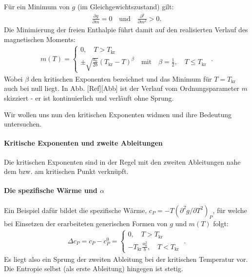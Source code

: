 Für ein Minimum von $g$ (im Gleichgewichtszustand) gilt:
\begin{align*}
    \frac{\partial g}{\partial m}=0 \quad \mathrm{und} \quad \frac{\partial ^g}{\partial m^2}>0.
\end{align*}
Die Minimierung der freien Enthalpie führt damit auf den realisierten Verlauf des magnetischen Moments:
\begin{align*}
    \boxed{m(T)=\left\{
    \begin{aligned}
        0, \quad T>T_\mathrm{kr}\\
        \pm \sqrt{\frac{a_0}{2b}}\left(T_\mathrm{kr}-T\right)^\beta\quad \mathrm{mit} \quad \beta=\frac{1}{2}, \quad T\leq T_\mathrm{kr}
    \end{aligned}
    \right.}\;.
\end{align*}
Wobei $\beta$ den kritischen Exponenten bezeichnet und das Minimum für $T=T_\mathrm{kr}$ auch bei null liegt. In Abb. [Ref][Abb] ist der Verlauf vom Ordnungsparameter $m$ skizziert - er ist kontinuierlich und verläuft ohne Sprung.

Wir wollen uns nun den kritischen Exponenten widmen und ihre Bedeutung untersuchen.
\paragraph*{Kritische Exponenten und zweite Ableitungen}
Die kritischen Exponenten sind in der Regel mit den zweiten Ableitungen nahe dem bzw. am kritischen Punkt verknüpft. 
\paragraph*{Die spezifische Wärme und $\alpha$}
Ein Beispiel dafür bildet die spezifische Wärme, $c_P=-T\left(\partial^2g/\partial T^2\right)_P$, für welche bei Einsetzen der erarbeiteten generischen Formen von $g$ und $m(T)$ folgt:
\begin{align}
    \label{eq:LandauSpezifWaermeSprung}
    \boxed{
        \Delta c_P=c_P-c_P^0 = \left\{
            \begin{aligned}
                0, \quad T>T_\mathrm{kr}\\
                -T_\mathrm{kr}\frac{a_0^2}{b},\quad T<T_\mathrm{kr}
            \end{aligned}
        \right.}\;.
\end{align}
Es liegt also ein Sprung der zweiten Ableitung bei der kritischen Temperatur vor. Die Entropie selbst (als erste Ableitung) hingegen ist stetig.

